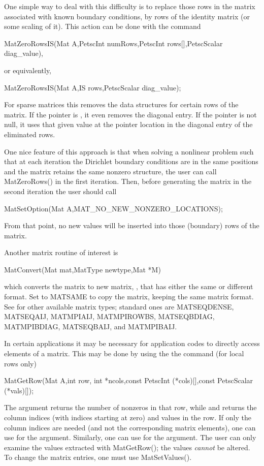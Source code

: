 One simple way to deal with this difficulty is to replace those rows in the 
matrix associated with known boundary conditions, by rows of the 
identity matrix (or some scaling of it). This action can be done with 
the command 
\begin{tabbing}
  MatZeroRowsIS(Mat A,PetscInt numRows,PetscInt rows[],PetscScalar diag\_value),
\end{tabbing}
or equivalently,
\begin{tabbing}
  MatZeroRowsIS(Mat A,IS rows,PetscScalar diag\_value);
\end{tabbing}
For sparse matrices this removes the data structures for certain rows 
of the matrix. If the pointer  is , it 
even removes the diagonal entry. If the pointer is not null, it uses that 
given value at the pointer location 
in the diagonal entry of the eliminated rows. 

One nice feature of this approach is that when solving a nonlinear problem 
such that at each iteration the Dirichlet boundary conditions are in the 
same positions and the matrix retains the same nonzero structure, the user 
can call MatZeroRows() in the first iteration. Then, before generating 
the matrix in the second iteration the user should call
\begin{tabbing}
  MatSetOption(Mat A,MAT\_NO\_NEW\_NONZERO\_LOCATIONS);
\end{tabbing}
From that point, 
no new values will be inserted into those (boundary) rows of 
the matrix.  

Another matrix routine of interest is 
\begin{tabbing}
  MatConvert(Mat mat,MatType newtype,Mat *M)
\end{tabbing}
which converts the matrix  to new matrix, , that has
either the same or different format.  Set  to MATSAME
to copy the matrix, keeping the same matrix format.  See 
 for other available matrix types;
standard ones are MATSEQDENSE, MATSEQAIJ, MATMPIAIJ, 
               MATMPIROWBS, MATSEQBDIAG, MATMPIBDIAG,  MATSEQBAIJ, and
               MATMPIBAIJ.

In certain applications it may be necessary for application codes
to directly access elements of a matrix. This may be done by using the 
the command (for local rows only)
\begin{tabbing}
  MatGetRow(Mat A,int row, int *ncols,const PetscInt (*cols)[],const PetscScalar (*vals)[]);
\end{tabbing}
The argument  returns the number of nonzeros in that row, 
while  and  returns the column indices (with indices
starting at zero) and values in the row. If only the column 
indices are needed (and not the corresponding matrix elements), one
can use  for the  argument. Similarly,
one can use  for the  argument.
The user can only examine the values extracted with MatGetRow();
the values {\em cannot} be altered. 
 
To change the matrix entries, one must use MatSetValues().

